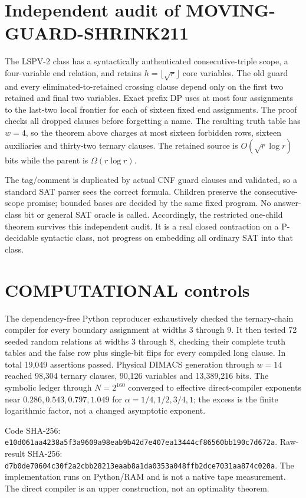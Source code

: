 \documentclass[11pt]{article}
\begin{document}
\section{Independent audit of MOVING-GUARD-SHRINK211}
The LSPV-2 class has a syntactically authenticated consecutive-triple scope,
a four-variable end relation, and retains $h=\lfloor\sqrt r\rfloor$ core
variables.  The old guard and every eliminated-to-retained crossing clause
depend only on the first two retained and final two variables.  Exact prefix
DP uses at most four assignments to the last-two local frontier for each of
sixteen fixed end assignments.  The proof checks all dropped clauses before
forgetting a name.  The resulting truth table has $w=4$, so the theorem above
charges at most sixteen forbidden rows, sixteen auxiliaries and thirty-two
ternary clauses.  The retained source is $O(\sqrt r\log r)$ bits while the
parent is $\Omega(r\log r)$.

The tag/comment is duplicated by actual CNF guard clauses and validated, so a
standard SAT parser sees the correct formula.  Children preserve the
consecutive-scope promise; bounded bases are decided by the same fixed
program.  No answer-class bit or general SAT oracle is called.  Accordingly,
the restricted one-child theorem survives this independent audit.  It is a
real closed contraction on a P-decidable syntactic class, not progress on
embedding all ordinary SAT into that class.

\section{COMPUTATIONAL controls}
The dependency-free Python reproducer exhaustively checked the ternary-chain
compiler for every boundary assignment at widths $3$ through $9$.  It then
tested 72 seeded random relations at widths $3$ through $8$, checking their
complete truth tables and the false row plus single-bit flips for every
compiled long clause.  In total 19,049 assertions passed.  Physical DIMACS
generation through $w=14$ reached 98,304 ternary clauses, 90,126 variables
and 13,389,216 bits.  The symbolic ledger through
$N=2^{160}$ converged to effective direct-compiler exponents near
$0.286,0.543,0.797,1.049$ for $\alpha=1/4,1/2,3/4,1$; the excess is the
finite logarithmic factor, not a changed asymptotic exponent.

Code SHA-256:
\texttt{e10d061aa4238a5f3a9609a98eab9b42d7e407ea13444cf86560bb190c7d672a}.
Raw-result SHA-256:
\texttt{d7b0de70604c30f2a2cbb28213eaab8a1da0353a048ffb2dce7031aa874c020a}.
The implementation runs on Python/RAM and is not a native tape measurement.
The direct compiler is an upper construction, not an optimality theorem.
\end{document}
